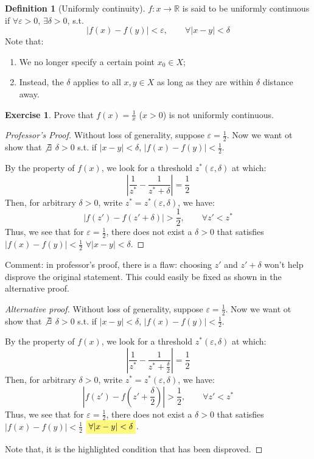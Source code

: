 \documentclass[12pt]{article}
\newcommand{\R}{{\mathbb R}}
\theoremstyle{definition}
\newtheorem{definition}[theorem]{Definition}
\newtheorem{exercise}[theorem]{Exercise}
\theoremstyle{plain}
\newcommand{\highlight}[1]{%
 \colorbox{yellow!50}{$\displaystyle#1$}}
\begin{document}
\begin{definition}
    [Uniformly continuity]
    $f : x \to \R$ is said to be uniformly continuous if $\forall \varepsilon > 
    0$, $\exists \delta > 0$, s.t. 
    \[
        |f(x) - f(y)| < \varepsilon, \qquad \forall |x - y| < \delta
    \]
    Note that: 
    \begin{enumerate}
        \item We no longer specify a certain point $x_0 \in X$;
        \item Instead, the $\delta$ applies to all $x,y\in X$ as long 
            as they are within $\delta$ distance away.
    \end{enumerate}
\end{definition}
\begin{exercise}
    Prove that $f(x) = \frac{1}{x}$ ($x > 0$) is not uniformly continuous.
    \begin{proof}[Professor's Proof]
        Without loss of generality, suppose $\varepsilon = \frac{1}{2}$. Now we 
        want ot show that $\not\exists$ $\delta > 0$ s.t. if $|x-y| < \delta$, 
        $|f(x) - f(y)| < \frac{1}{2}$. 

        By the property of $f(x)$, we look for a threshold $z^*(\varepsilon, 
        \delta)$ at which:
        \[
            \left| \frac{1}{z^*} - \frac{1}{z^* + \delta}\right| = 
            \frac{1}{2}
        \]
        Then, for arbitrary $\delta> 0$, write $z^* = z^*(\varepsilon, \delta)$, 
        we have:
        \[
            |f(z') - f(z' + \delta)| > \frac{1}{2}, \qquad \forall z' < z^*
        \]
        Thus, we see that for $\varepsilon  = \frac{1}{2}$, there does not exist 
        a $\delta >0$ that satisfies $|f(x) - f(y)| <  \frac{1}{2}$ $\forall 
        |x-y| < \delta$.
    \end{proof}
    Comment: in professor's proof, there is a flaw: choosing $z'$ and $z' 
    +\delta$ won't help disprove the original statement.  This could easily be 
    fixed as shown in the alternative proof.
    \begin{proof}[Alternative proof]
        Without loss of generality, suppose $\varepsilon = \frac{1}{2}$. Now we 
        want ot show that $\not\exists$ $\delta > 0$ s.t. if $|x-y| < \delta$, 
        $|f(x) - f(y)| < \frac{1}{2}$. 

        By the property of $f(x)$, we look for a threshold $z^*(\varepsilon, 
        \delta)$ at which:
        \[
            \left| \frac{1}{z^*} - \frac{1}{z^* + \frac{\delta}{2}}\right| = 
            \frac{1}{2}
        \]
        Then, for arbitrary $\delta> 0$, write $z^* = z^*(\varepsilon, \delta)$, 
        we have:
        \[
            |f(z') - f(z' + \frac{\delta}{2})| > \frac{1}{2}, \qquad \forall z' < z^*
        \]
        Thus, we see that for $\varepsilon  = \frac{1}{2}$, there does not exist 
        a $\delta >0$ that satisfies $|f(x) - f(y)| <  \frac{1}{2}$ 
        $\highlight{\forall |x-y| < \delta}$.

        Note that, it is the highlighted condition that has been disproved.
        
    \end{proof}
\end{exercise}
\end{document}
